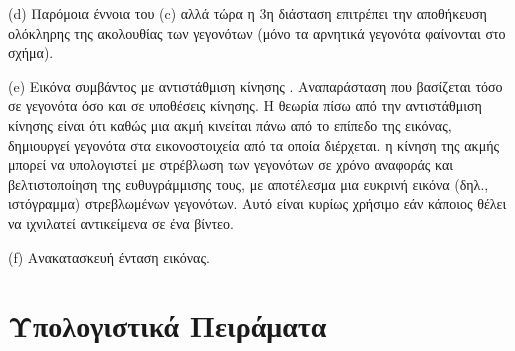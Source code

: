 \documentclass[12pt]{report}
\begin{document}
(\textlatin{d}) Παρόμοια έννοια του (c) αλλά τώρα η 3η διάσταση επιτρέπει την αποθήκευση ολόκληρης της ακολουθίας των γεγονότων (μόνο τα αρνητικά γεγονότα φαίνονται στο σχήμα).

(\textlatin{e}) Εικόνα συμβάντος με αντιστάθμιση κίνησης \cite{Gallego2019}. Αναπαράσταση που βασίζεται τόσο σε γεγονότα όσο και σε υποθέσεις κίνησης. Η θεωρία πίσω από την αντιστάθμιση κίνησης είναι ότι καθώς μια ακμή κινείται πάνω από το επίπεδο της εικόνας, δημιουργεί γεγονότα στα εικονοστοιχεία από τα οποία διέρχεται. η κίνηση της ακμής μπορεί να υπολογιστεί με στρέβλωση των γεγονότων σε χρόνο αναφοράς και βελτιστοποίηση της ευθυγράμμισης τους, με αποτέλεσμα μια ευκρινή εικόνα (δηλ., ιστόγραμμα) στρεβλωμένων γεγονότων. Αυτό είναι κυρίως χρήσιμο εάν κάποιος θέλει να ιχνιλατεί αντικείμενα σε ένα βίντεο.

(\textlatin{f}) Ανακατασκευή ένταση εικόνας\cite{rebecq2019}.


\chapter{Υπολογιστικά Πειράματα}


\end{document}
